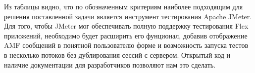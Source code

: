 Из таблицы видно, что по обозначенным критериям наиболее подходящим для 
решения поставленной задачи является инструмент тестирования Apache JMeter. Для того, 
чтобы JMeter мог обеспечивать полную поддержку тестирования Flex приложений, необходимо 
будет расширить его фунционал, добавив отображение AMF сообщений в понятной пользователю 
форме и возможность запуска тестов в несколько потоков без дублирования сессий с сервером. 
Открытый код и наличие документации для разработчиков позволяют нам это сделать.   


     